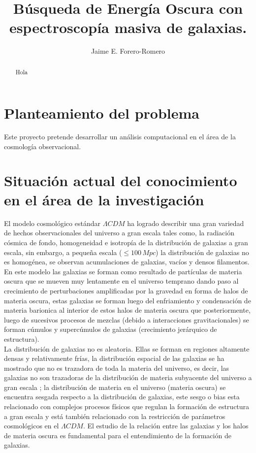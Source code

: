 \documentclass[12pt]{article}
\title{B\'usqueda de Energ\'ia Oscura con espectroscop\'ia masiva de galaxias.}
\author{Jaime E. Forero-Romero}
\begin{document}
\maketitle
\tableofcontents

\begin{abstract}
Hola
\end{abstract}

\section{Planteamiento del problema}
Este proyecto pretende desarrollar un an\'alisis computacional en el
\'area de la cosmolog\'ia observacional. 


\section{Situación actual del conocimiento en el área de la investigación}

El modelo cosmológico estándar $\Lambda CDM$ ha logrado describir una gran 
variedad de hechos observacionales del universo a gran escala tales como, la 
radiación cósmica de fondo, homogeneidad e isotropía de la distribución de 
galaxias a gran escala, sin embargo, a pequeña escala ($\leq 100\, Mpc$) la 
distribución de galaxias no es homogénea, se observan acumulaciones de 
galaxias, vacíos y densos filamentos. En este modelo las galaxias se forman 
como resultado de partículas de materia oscura que se mueven muy lentamente en 
el universo temprano dando paso al crecimiento de perturbaciones amplificadas 
por la gravedad en forma de halos de materia oscura, estas galaxias se forman 
luego del enfriamiento y condensación de materia barionica al interior de estos 
halos de materia oscura que posteriormente, luego de sucesivos procesos de 
mezclas (debido a interacciones gravitacionales) se forman cúmulos y 
supercúmulos de galaxias (crecimiento jerárquico de estructura). \\

La distribución de galaxias no es aleatoria. Ellas se forman en regiones 
altamente densas y relativamente frías, la distribución espacial de las 
galaxias se ha mostrado que no es trazadora de toda la materia del universo, es 
decir, las galaxias no son trazadoras de la distribución de materia subyacente 
del universo a gran escala \cite{1984ApJ...284L...9K}; la distribución de 
materia en el universo (materia oscura) se encuentra sesgada respecto a la 
distribución de galaxias, este sesgo o bias esta relacionado con complejos 
procesos físicos que regulan la formación de estructura a gran escala y está 
también relacionado con la restricción de parámetros cosmológicos en el 
$\Lambda CDM$. El estudio de la relación entre las galaxias y los halos de 
materia oscura es fundamental para el entendimiento de la formación de 
galaxias.\\
\end{document}
